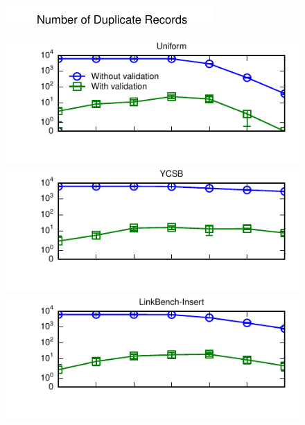 \begin{figure}
\begin{center}
\hspace{4em}
\begin{minipage}[l]{0cm}
\includegraphics[angle=90, width=.23in]{figs/pk-workload-ylabel.pdf}
\end{minipage}
\begin{minipage}{\figscale\columnwidth}
\includegraphics[width=\figscale\columnwidth]{figs/pk-workload-uniform-violations.pdf}\vspace{-1em}
\includegraphics[width=\figscale\columnwidth]{figs/pk-workload-ycsb-violations.pdf}\vspace{-1em}
\includegraphics[width=\figscale\columnwidth]{figs/pk-workload-linkbench-ins-violations.pdf}\vspace{-1em}

\end{minipage}
\end{center}
\end{figure}
